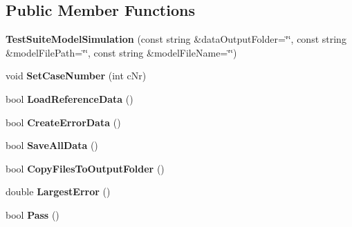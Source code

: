 \subsection*{Public Member Functions}
\begin{DoxyCompactItemize}
\item 
\hypertarget{classrr_1_1_test_suite_model_simulation_a56a48df0a7972f381ad9776741e2bc0a}{{\bfseries Test\-Suite\-Model\-Simulation} (const string \&data\-Output\-Folder=\char`\"{}\char`\"{}, const string \&model\-File\-Path=\char`\"{}\char`\"{}, const string \&model\-File\-Name=\char`\"{}\char`\"{})}\label{classrr_1_1_test_suite_model_simulation_a56a48df0a7972f381ad9776741e2bc0a}

\item 
\hypertarget{classrr_1_1_test_suite_model_simulation_a19df03ff6ffe762381ffe84d5365cc90}{void {\bfseries Set\-Case\-Number} (int c\-Nr)}\label{classrr_1_1_test_suite_model_simulation_a19df03ff6ffe762381ffe84d5365cc90}

\item 
\hypertarget{classrr_1_1_test_suite_model_simulation_ace89637b9746fa91a7fc79a41b0a9ca2}{bool {\bfseries Load\-Reference\-Data} ()}\label{classrr_1_1_test_suite_model_simulation_ace89637b9746fa91a7fc79a41b0a9ca2}

\item 
\hypertarget{classrr_1_1_test_suite_model_simulation_ab84ebb55fa44c62b0318c64f00e9c99c}{bool {\bfseries Create\-Error\-Data} ()}\label{classrr_1_1_test_suite_model_simulation_ab84ebb55fa44c62b0318c64f00e9c99c}

\item 
\hypertarget{classrr_1_1_test_suite_model_simulation_a7236cc31d52fa3d73c95f4a5d781920a}{bool {\bfseries Save\-All\-Data} ()}\label{classrr_1_1_test_suite_model_simulation_a7236cc31d52fa3d73c95f4a5d781920a}

\item 
\hypertarget{classrr_1_1_test_suite_model_simulation_aba716bb560c028ffcb59724d952d307c}{bool {\bfseries Copy\-Files\-To\-Output\-Folder} ()}\label{classrr_1_1_test_suite_model_simulation_aba716bb560c028ffcb59724d952d307c}

\item 
\hypertarget{classrr_1_1_test_suite_model_simulation_a75aacfcd88048d3abb9b73b3b7136023}{double {\bfseries Largest\-Error} ()}\label{classrr_1_1_test_suite_model_simulation_a75aacfcd88048d3abb9b73b3b7136023}

\item 
\hypertarget{classrr_1_1_test_suite_model_simulation_a96f82290fd5589cead73b90e42bd8110}{bool {\bfseries Pass} ()}\label{classrr_1_1_test_suite_model_simulation_a96f82290fd5589cead73b90e42bd8110}


\end{DoxyCompactItemize}

